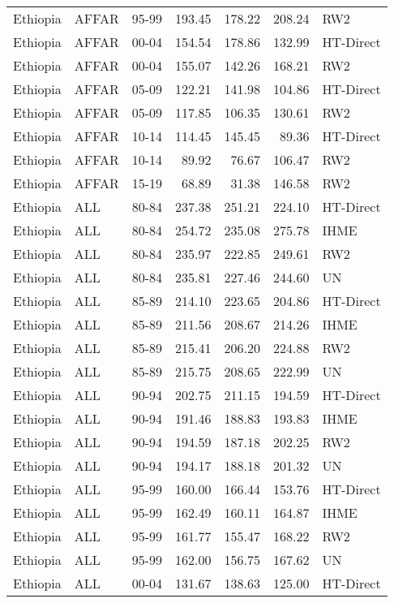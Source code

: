 \begin{longtable}{lllrrrl}
  Ethiopia & AFFAR & 95-99 & 193.45 & 178.22 & 208.24 & RW2 \\ 
  Ethiopia & AFFAR & 00-04 & 154.54 & 178.86 & 132.99 & HT-Direct \\ 
  Ethiopia & AFFAR & 00-04 & 155.07 & 142.26 & 168.21 & RW2 \\ 
  Ethiopia & AFFAR & 05-09 & 122.21 & 141.98 & 104.86 & HT-Direct \\ 
  Ethiopia & AFFAR & 05-09 & 117.85 & 106.35 & 130.61 & RW2 \\ 
  Ethiopia & AFFAR & 10-14 & 114.45 & 145.45 & 89.36 & HT-Direct \\ 
  Ethiopia & AFFAR & 10-14 & 89.92 & 76.67 & 106.47 & RW2 \\ 
  Ethiopia & AFFAR & 15-19 & 68.89 & 31.38 & 146.58 & RW2 \\ 
  Ethiopia & ALL & 80-84 & 237.38 & 251.21 & 224.10 & HT-Direct \\ 
  Ethiopia & ALL & 80-84 & 254.72 & 235.08 & 275.78 & IHME \\ 
  Ethiopia & ALL & 80-84 & 235.97 & 222.85 & 249.61 & RW2 \\ 
  Ethiopia & ALL & 80-84 & 235.81 & 227.46 & 244.60 & UN \\ 
  Ethiopia & ALL & 85-89 & 214.10 & 223.65 & 204.86 & HT-Direct \\ 
  Ethiopia & ALL & 85-89 & 211.56 & 208.67 & 214.26 & IHME \\ 
  Ethiopia & ALL & 85-89 & 215.41 & 206.20 & 224.88 & RW2 \\ 
  Ethiopia & ALL & 85-89 & 215.75 & 208.65 & 222.99 & UN \\ 
  Ethiopia & ALL & 90-94 & 202.75 & 211.15 & 194.59 & HT-Direct \\ 
  Ethiopia & ALL & 90-94 & 191.46 & 188.83 & 193.83 & IHME \\ 
  Ethiopia & ALL & 90-94 & 194.59 & 187.18 & 202.25 & RW2 \\ 
  Ethiopia & ALL & 90-94 & 194.17 & 188.18 & 201.32 & UN \\ 
  Ethiopia & ALL & 95-99 & 160.00 & 166.44 & 153.76 & HT-Direct \\ 
  Ethiopia & ALL & 95-99 & 162.49 & 160.11 & 164.87 & IHME \\ 
  Ethiopia & ALL & 95-99 & 161.77 & 155.47 & 168.22 & RW2 \\ 
  Ethiopia & ALL & 95-99 & 162.00 & 156.75 & 167.62 & UN \\ 
  Ethiopia & ALL & 00-04 & 131.67 & 138.63 & 125.00 & HT-Direct \\ 

\end{longtable}
